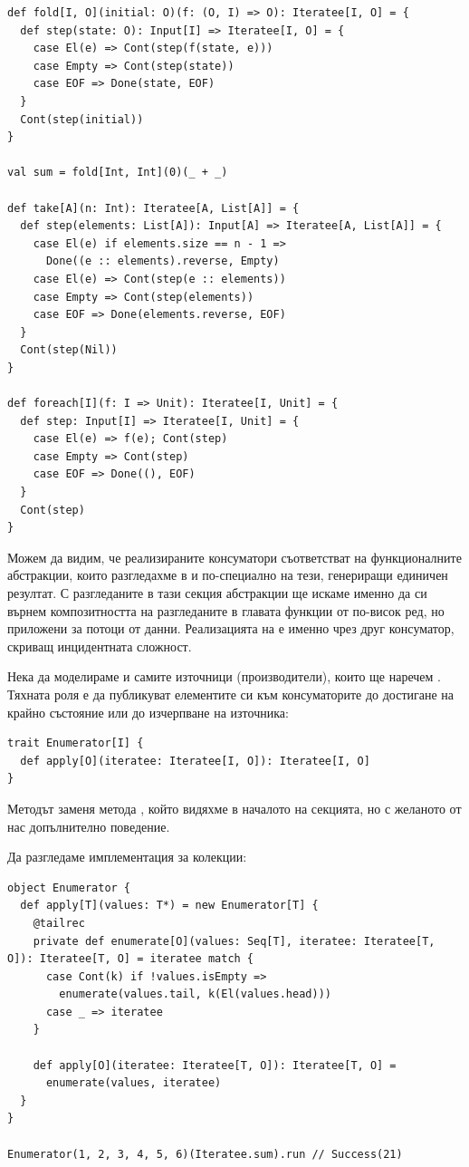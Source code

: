 \begin{lstlisting}
def fold[I, O](initial: O)(f: (O, I) => O): Iteratee[I, O] = {
  def step(state: O): Input[I] => Iteratee[I, O] = {
    case El(e) => Cont(step(f(state, e)))
    case Empty => Cont(step(state))
    case EOF => Done(state, EOF)
  }
  Cont(step(initial))
}

val sum = fold[Int, Int](0)(_ + _)

def take[A](n: Int): Iteratee[A, List[A]] = {
  def step(elements: List[A]): Input[A] => Iteratee[A, List[A]] = {
    case El(e) if elements.size == n - 1 =>
      Done((e :: elements).reverse, Empty)
    case El(e) => Cont(step(e :: elements))
    case Empty => Cont(step(elements))
    case EOF => Done(elements.reverse, EOF)
  }
  Cont(step(Nil))
}

def foreach[I](f: I => Unit): Iteratee[I, Unit] = {
  def step: Input[I] => Iteratee[I, Unit] = {
    case El(e) => f(e); Cont(step)
    case Empty => Cont(step)
    case EOF => Done((), EOF)
  }
  Cont(step)
}
\end{lstlisting}

Можем да видим, че реализираните консуматори съответстват на функционалните абстракции, които разгледахме в  и по-специално на тези, генериращи единичен резултат. С разгледаните в тази секция абстракции ще искаме именно да си върнем композитността на разгледаните в главата функции от по-висок ред, но приложени за потоци от данни. Реализацията на  е именно чрез друг консуматор, скриващ инцидентната сложност.

Нека да моделираме и самите източници (производители), които ще наречем . Тяхната роля е да публикуват елементите си към консуматорите до достигане на крайно състояние или до изчерпване на източника:

\begin{lstlisting}
trait Enumerator[I] {
  def apply[O](iteratee: Iteratee[I, O]): Iteratee[I, O]
}
\end{lstlisting}

Методът  заменя метода , който видяхме в началото на секцията, но с желаното от нас допълнително поведение.

Да разгледаме имплементация за колекции:

\begin{lstlisting}
object Enumerator {
  def apply[T](values: T*) = new Enumerator[T] {
    @tailrec
    private def enumerate[O](values: Seq[T], iteratee: Iteratee[T, O]): Iteratee[T, O] = iteratee match {
      case Cont(k) if !values.isEmpty =>
        enumerate(values.tail, k(El(values.head)))
      case _ => iteratee
    }
  
    def apply[O](iteratee: Iteratee[T, O]): Iteratee[T, O] =
      enumerate(values, iteratee)
  }
}

Enumerator(1, 2, 3, 4, 5, 6)(Iteratee.sum).run // Success(21)
\end{lstlisting}


